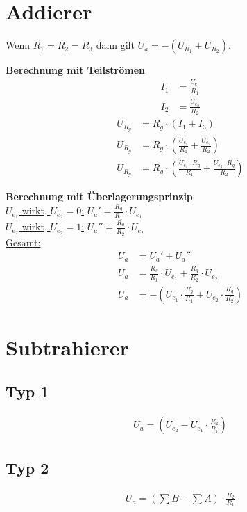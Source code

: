 \newpage

\section{Addierer}
Wenn $R_1=R_2=R_3$ dann gilt $U_a=-(U_{R_1}+U_{R_2})$.

\textbf{Berechnung mit Teilströmen}
\begin{align}
    I_1&=\frac{U_{e_1}}{R_1} \\
    I_2&=\frac{U_{e_2}}{R_2}
\end{align}
\begin{align}   
    U_{R_g}&=R_g\cdot(I_1+I_3) \\
    U_{R_g}&=R_g\cdot(\frac{U_{e_1}}{R_1}+\frac{U_{e_2}}{R_2}) \\
    U_{R_g}&=R_g\cdot(\frac{U_{e_1}\cdot R_g}{R_1}+\frac{U_{e_2}\cdot R_g}{R_2})
\end{align}

\textbf{Berechnung mit Überlagerungsprinzip} \\

\underline{$U_{e_1}$ wirkt, $U_{e_2}=0$:} \hspace{2cm} $U_a'=\frac{R_g}{R_1}\cdot U_{e_1}$ \\

\underline{$U_{e_2}$ wirkt, $U_{e_2}=1$:} \hspace{2cm} $U_a''=\frac{R_g}{R_2}\cdot U_{e_2}$ \\

\underline{Gesamt:}
\begin{align}  
    U_a&=U_a'+U_a''  \\
    U_a&=\frac{R_g}{R_1}\cdot U_{e_1}+\frac{R_g}{R_2}\cdot U_{e_2} \\
    U_a&=-(U_{e_1}\cdot\frac{R_g}{R_1}+U_{e_2}\cdot\frac{R_g}{R_2})
\end{align}

\section{Subtrahierer}
\subsection{Typ 1}
\begin{align}
    U_a=(U_{e_2}-U_{e_1}\cdot{\frac{R_2}{R_1}})
\end{align}

\subsection{Typ 2}
\begin{align}
    U_a=(\sum B - \sum A)\cdot\frac{R_2}{R_1}
\end{align}

